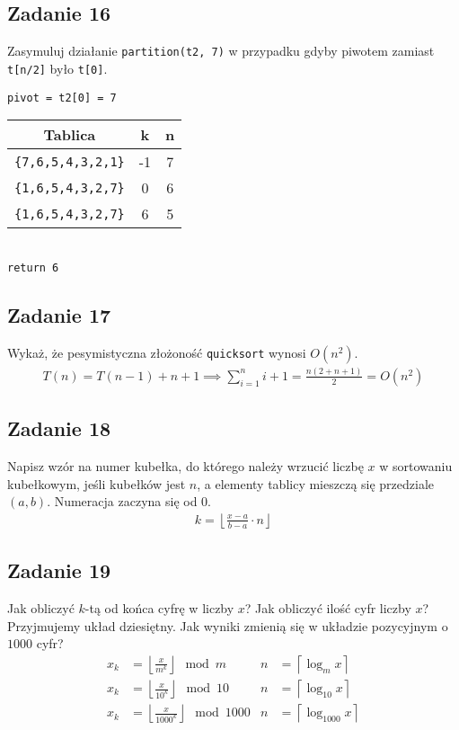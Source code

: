 \documentclass{article}
\begin{document}
\subsection*{Zadanie 16}
Zasymuluj działanie \verb+partition(t2, 7)+ w przypadku gdyby piwotem zamiast \verb+t[n/2]+ było \verb+t[0]+.
\begin{center}
    \verb+pivot = t2[0] = 7+ \\[1ex]
    \begin{tabular}{c c c}
        \textbf{Tablica}       & \textbf{k} & \textbf{n} \\
        \hline
        \verb+{7,6,5,4,3,2,1}+ & -1         & 7          \\
        \verb+{1,6,5,4,3,2,7}+ & 0          & 6          \\
        \verb+{1,6,5,4,3,2,7}+ & 6          & 5          \\
    \end{tabular} \\[1ex]
    \verb+return 6+
\end{center}

\subsection*{Zadanie 17}
Wykaż, że pesymistyczna złożoność \verb+quicksort+ wynosi $O(n^2)$.
\begin{gather*}
    T(n) = T(n-1) + n + 1 \implies \sum_{i=1}^{n} i + 1 = \frac{n(2 + n + 1)}{2} = O(n^2)
\end{gather*}

\subsection*{Zadanie 18}
Napisz wzór na numer kubełka, do którego należy wrzucić liczbę $x$ w sortowaniu
kubełkowym, jeśli kubełków jest $n$, a elementy tablicy mieszczą się przedziale $(a, b)$.
Numeracja zaczyna się od $0$.
\begin{gather*}
    k = \left \lfloor \frac{x - a}{b - a} \cdot n \right \rfloor
\end{gather*}

\subsection*{Zadanie 19}
Jak obliczyć $k$-tą od końca cyfrę w liczby $x$? Jak obliczyć ilość cyfr liczby $x$?
Przyjmujemy układ dziesiętny. Jak wyniki zmienią się w układzie pozycyjnym o $1000$ cyfr?
\begin{align*}
    x_k & = \left \lfloor \frac{x}{m^k} \right \rfloor \mod m       & n & = \left \lceil \log_m x \right \rceil      \\
    x_k & = \left \lfloor \frac{x}{10^k} \right \rfloor \mod 10     & n & = \left \lceil \log_{10} x \right \rceil   \\
    x_k & = \left \lfloor \frac{x}{1000^k} \right \rfloor \mod 1000 & n & = \left \lceil \log_{1000} x \right \rceil
\end{align*}
\end{document}
